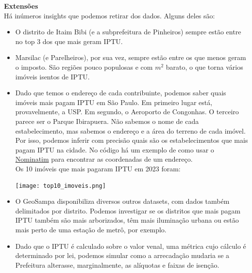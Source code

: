 \documentclass[12pt,a4paper]{article}
\theoremstyle{break}
\begin{document}
\textbf{Extensões}\\
\ident Há inúmeros insights que podemos retirar dos dados. Alguns deles são:\\
\begin{itemize}
    \item O distrito de Itaim Bibi (e a subprefeitura de Pinheiros) sempre estão entre no top 3 dos que mais geram IPTU.
    \item Marsilac (e Parelheiros), por sua vez, sempre estão entre os que menos geram o imposto. São regiões pouco populosas e com \( m^2 \) barato, o que torna vários imóveis isentos de IPTU.
    \item Dado que temos o endereço de cada contribuinte, podemos saber quais imóveis mais pagam IPTU em São Paulo. Em primeiro lugar está, provavelmente, a USP. Em segundo, o Aeroporto de Congonhas. O terceiro parece ser o Parque Ibirapuera. Não sabemos o nome de cada estabelecimento, mas sabemos o endereço e a área do terreno de cada imóvel. Por isso, podemos inferir com precisão quais são os estabelecimentos que mais pagam IPTU na cidade. No código há um exemplo de como usar o \href{https://nominatim.org/release-docs/latest/api/Overview/}{Nominatim} para encontrar as coordenadas de um endereço.\\
    Os 10 imóveis que mais pagaram IPTU em 2023 foram:\\
\begin{center}
    \texttt{[image: top10\_imoveis.png]}
\end{center}
    \item O GeoSampa disponibiliza diversos outros datasets, com dados também delimitados por distrito. Podemos investigar se os distritos que mais pagam IPTU também são mais arborizados, têm mais iluminação urbana ou estão mais perto de uma estação de metrô, por exemplo.
    \item Dado que o IPTU é calculado sobre o valor venal, uma métrica cujo cálculo é determinado por lei, podemos simular como a arrecadação mudaria se a Prefeitura alterasse, marginalmente, as alíquotas e faixas de isenção.
\end{itemize}
\end{document}
